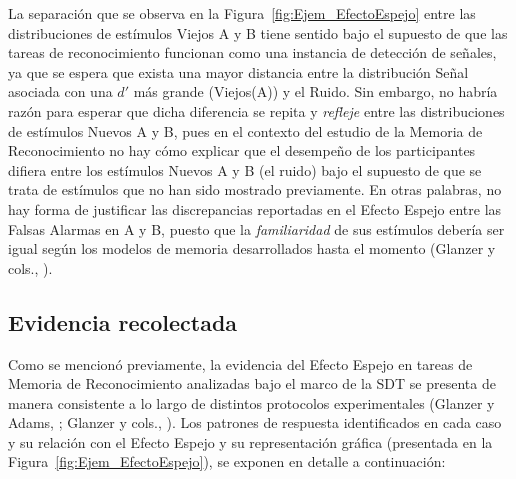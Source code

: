 La separación que se observa en la Figura~\ref{fig:Ejem_EfectoEspejo} entre las distribuciones de estímulos Viejos A y B tiene sentido bajo el supuesto de que las tareas de reconocimiento funcionan como una instancia de detección de señales, ya que se espera que exista una mayor distancia entre la distribución Señal asociada con una $d'$ más grande (Viejos(A)) y el Ruido. Sin embargo, no habría razón para esperar que dicha diferencia se repita y \textit{refleje} entre las distribuciones de estímulos Nuevos A y B, pues en el contexto del estudio de la Memoria de Reconocimiento no hay cómo explicar que el desempeño de los participantes difiera entre los estímulos Nuevos A y B (el ruido) bajo el supuesto de que se trata de estímulos que no han sido mostrado previamente. En otras palabras, no hay forma de justificar las discrepancias reportadas en el Efecto Espejo entre las Falsas Alarmas en A y B, puesto que la \textit{familiaridad} de sus estímulos debería ser igual según los modelos de memoria desarrollados hasta el momento (Glanzer y cols., \citeyear{Glanzer1993}).\\

\subsection{Evidencia recolectada}

Como se mencionó previamente, la evidencia del Efecto Espejo en tareas de Memoria de Reconocimiento analizadas bajo el marco de la SDT se presenta de manera consistente a lo largo de distintos protocolos experimentales (Glanzer y Adams, \citeyear{Glanzer1990}; Glanzer y cols., \citeyear{Glanzer1993}). Los patrones de respuesta identificados en cada caso y su relación con el Efecto Espejo y su representación gráfica (presentada en la Figura~\ref{fig:Ejem_EfectoEspejo}), se exponen en detalle a continuación:\\

